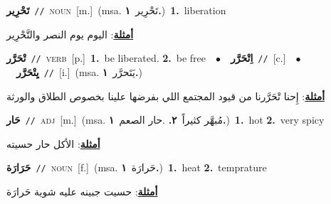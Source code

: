 \documentclass[10pt,a4paper,twoside]{article} %
\begin{document}
\begin{multicols}{2}
{\setlength\topsep{0pt}\textbf{\foreignlanguage{arabic}{تَحْرِير}}\ {\color{gray}\texttt{//}\color{black}}\ \textsc{noun}\ [m.]\ \color{gray}(msa. \foreignlanguage{arabic}{تَحْرِير}~\foreignlanguage{arabic}{\textbf{١.}})\color{black}\ \textbf{1.}~liberation\  \begin{flushright}\color{gray}\foreignlanguage{arabic}{\textbf{\underline{\foreignlanguage{arabic}{أمثلة}}}: اليوم يوم النصر والتَّحْرِير}\end{flushright}\color{black}} \vspace{2mm}

{\setlength\topsep{0pt}\textbf{\foreignlanguage{arabic}{تْحَرَّر}}\ {\color{gray}\texttt{//}\color{black}}\ \textsc{verb}\ [p.]\ \textbf{1.}~be liberated.  \textbf{2.}~be free\ \ $\bullet$\ \ \setlength\topsep{0pt}\textbf{\foreignlanguage{arabic}{اِتْحَرَّر}}\ {\color{gray}\texttt{//}\color{black}}\ [c.]\ \ $\bullet$\ \ \setlength\topsep{0pt}\textbf{\foreignlanguage{arabic}{يِتْحَرَّر}}\ {\color{gray}\texttt{//}\color{black}}\ [i.]\ \color{gray}(msa. \foreignlanguage{arabic}{يَتَحرَّر}~\foreignlanguage{arabic}{\textbf{١.}})\color{black}\  \begin{flushright}\color{gray}\foreignlanguage{arabic}{\textbf{\underline{\foreignlanguage{arabic}{أمثلة}}}: إِحنا تْحَرَّرنا من قيود المجتمع اللي بفرضها علينا بخصوص الطلاق والورثة}\end{flushright}\color{black}} \vspace{2mm}

{\setlength\topsep{0pt}\textbf{\foreignlanguage{arabic}{حَار}}\ {\color{gray}\texttt{//}\color{black}}\ \textsc{adj}\ [m.]\ \color{gray}(msa. \foreignlanguage{arabic}{مُبهَّر كثيراً}~\foreignlanguage{arabic}{\textbf{٢.}}  .\foreignlanguage{arabic}{حار الصعم}~\foreignlanguage{arabic}{\textbf{١.}})\color{black}\ \textbf{1.}~hot  \textbf{2.}~very spicy\  \begin{flushright}\color{gray}\foreignlanguage{arabic}{\textbf{\underline{\foreignlanguage{arabic}{أمثلة}}}: الأكل حار حسيته}\end{flushright}\color{black}} \vspace{2mm}

{\setlength\topsep{0pt}\textbf{\foreignlanguage{arabic}{حَرَارَة}}\ {\color{gray}\texttt{//}\color{black}}\ \textsc{noun}\ [f.]\ \color{gray}(msa. \foreignlanguage{arabic}{حَرارَة}~\foreignlanguage{arabic}{\textbf{١.}})\color{black}\ \textbf{1.}~heat  \textbf{2.}~temprature\  \begin{flushright}\color{gray}\foreignlanguage{arabic}{\textbf{\underline{\foreignlanguage{arabic}{أمثلة}}}: حسيت جبينه عليه شوية حَرارَة}\end{flushright}\color{black}} \vspace{2mm}


\end{multicols}
\end{document}
